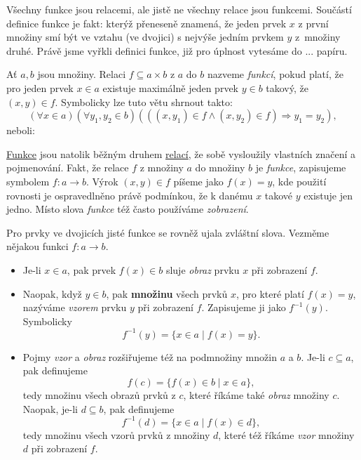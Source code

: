 Všechny funkce jsou relacemi, ale jistě ne všechny relace jsou funkcemi.
Součástí definice funkce je fakt: 
kterýž přeneseně znamená, že jeden prvek $x$ z první množiny smí být ve vztahu
(ve dvojici) s nejvýše jedním prvkem $y$ z~množiny druhé. Právě jsme vyřkli
definici funkce, již pro úplnost vytesáme do ... papíru.

\begin{definition}[Funkce]
  \label{def:funkce}
  Ať $a, b$ jsou množiny. Relaci $f \subseteq a \times b$ z $a$ do $b$ nazveme
  \emph{funkcí}, pokud platí, že pro jeden prvek $x \in a$ existuje maximálně
  jeden prvek $y \in b$ takový, že $(x, y) \in f$. Symbolicky lze tuto větu
  shrnout takto:
  \begin{equation}
    \label{eq:funkce}
    ( \forall x \in a)( \forall y_1, y_2 \in b)(((x, y_1) \in f \wedge (x, y_2)
    \in f) \Rightarrow y_1 = y_2),
  \end{equation}
  neboli: 
\end{definition}
\begin{notation}
  \hyperref[def:funkce]{Funkce} jsou natolik běžným druhem
  \hyperref[def:relace]{relací}, že sobě vysloužily vlastních značení a
  pojmenování. Fakt, že relace $f$ z množiny $a$ do množiny $b$ je
  \emph{funkce}, zapisujeme symbolem $f\colon a \to b$. Výrok $(x, y) \in f$
  píšeme jako $f(x) = y$, kde použití rovnosti je ospravedlněno právě podmínkou,
  že k danému $x$ takové $y$ existuje jen jedno. Místo slova \emph{funkce} též
  často používáme \emph{zobrazení}.

  Pro prvky ve dvojicích jisté funkce se rovněž ujala zvláštní slova. Vezměme
  nějakou funkci $f\colon a \to b$.
  \begin{itemize}
    \item Je-li $x \in a$, pak prvek $f(x) \in b$ sluje \emph{obraz} prvku $x$
      při zobrazení $f$.
    \item Naopak, když $y \in b$, pak \textbf{množinu} všech prvků $x$, pro
      které platí $f(x) = y$, nazýváme \emph{vzorem} prvku $y$ při zobrazení
      $f$. Zapisujeme ji jako $f^{-1}(y)$. Symbolicky
      \[
        f^{-1}(y) = \{x \in a \mid f(x) = y\}.
      \]
    \item Pojmy \emph{vzor} a \emph{obraz} rozšiřujeme též na podmnožiny množin
      $a$ a $b$. Je-li $c \subseteq a$, pak definujeme
      \[
        f(c) = \{f(x) \in b \mid x \in a\},
      \]
      tedy množinu všech obrazů prvků z $c$, které říkáme také \emph{obraz}
      množiny $c$. Naopak, je-li $d \subseteq b$, pak definujeme
      \[
        f^{-1}(d) = \{x \in a \mid f(x) \in d\},
      \]
      tedy množinu všech vzorů prvků z množiny $d$, které též říkáme \emph{vzor}
      množiny $d$ při zobrazení $f$.
  \end{itemize}
\end{notation}
